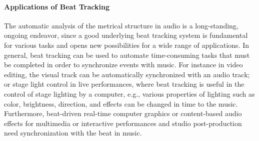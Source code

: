 \documentclass{scrartcl}
\begin{document}






\paragraph{Applications of Beat Tracking}

The automatic analysis of the metrical structure in audio is a long-standing, ongoing endeavor, since a good underlying beat tracking system is fundamental for various tasks and opens new possibilities for a wide range of applications. In general, beat tracking can be used to automate time-consuming tasks that must be completed in order to synchronize events with music. For instance in video editing, the visual track can be automatically synchronized with an audio track; or stage light control in live performances, where beat tracking is useful in the control of stage lighting by a computer, e.g., various properties of lighting such as color, brightness, direction, and effects can be changed in time to the music. Furthermore, beat-driven real-time computer graphics or content-based audio effects for multimedia or interactive performances and studio post-production need synchronization with the beat in music.
\end{document}
